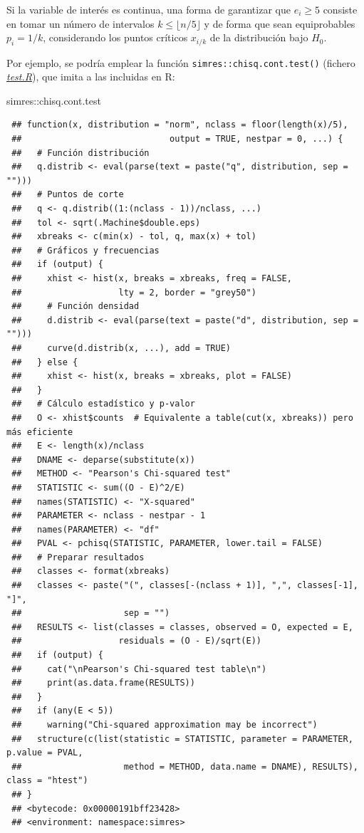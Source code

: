 \documentclass[
]{book}
\newenvironment{Shaded}{\begin{snugshade}}{\end{snugshade}}
\newcommand{\NormalTok}[1]{#1}
\newcommand{\SpecialCharTok}[1]{\textcolor[rgb]{0.00,0.00,0.00}{#1}}
\theoremstyle{break}
\theoremstyle{nonumberplain}
\begin{document}
Si la variable de interés es continua, una forma de garantizar que \(e_{i}\geq5\) consiste en tomar un número de intervalos \(k\leq \lfloor n/5 \rfloor\) y de forma que sean equiprobables \(p_{i}=1/k\),
considerando los puntos críticos \(x_{i/k}\) de la distribución bajo \(H_0\).

Por ejemplo, se podría emplear la función \texttt{simres::chisq.cont.test()} (fichero \href{R/test.R}{\emph{test.R}}), que imita a las incluidas en R:

\begin{Shaded}
\begin{Highlighting}[]
\NormalTok{simres}\SpecialCharTok{::}\NormalTok{chisq.cont.test}
\end{Highlighting}
\end{Shaded}

\begin{verbatim}
 ## function(x, distribution = "norm", nclass = floor(length(x)/5),
 ##                             output = TRUE, nestpar = 0, ...) {
 ##   # Función distribución
 ##   q.distrib <- eval(parse(text = paste("q", distribution, sep = "")))
 ##   # Puntos de corte
 ##   q <- q.distrib((1:(nclass - 1))/nclass, ...)
 ##   tol <- sqrt(.Machine$double.eps)
 ##   xbreaks <- c(min(x) - tol, q, max(x) + tol)
 ##   # Gráficos y frecuencias
 ##   if (output) {
 ##     xhist <- hist(x, breaks = xbreaks, freq = FALSE,
 ##                   lty = 2, border = "grey50")
 ##     # Función densidad
 ##     d.distrib <- eval(parse(text = paste("d", distribution, sep = "")))
 ##     curve(d.distrib(x, ...), add = TRUE)
 ##   } else {
 ##     xhist <- hist(x, breaks = xbreaks, plot = FALSE)
 ##   }
 ##   # Cálculo estadístico y p-valor
 ##   O <- xhist$counts  # Equivalente a table(cut(x, xbreaks)) pero más eficiente
 ##   E <- length(x)/nclass
 ##   DNAME <- deparse(substitute(x))
 ##   METHOD <- "Pearson's Chi-squared test"
 ##   STATISTIC <- sum((O - E)^2/E)
 ##   names(STATISTIC) <- "X-squared"
 ##   PARAMETER <- nclass - nestpar - 1
 ##   names(PARAMETER) <- "df"
 ##   PVAL <- pchisq(STATISTIC, PARAMETER, lower.tail = FALSE)
 ##   # Preparar resultados
 ##   classes <- format(xbreaks)
 ##   classes <- paste("(", classes[-(nclass + 1)], ",", classes[-1], "]",
 ##                    sep = "")
 ##   RESULTS <- list(classes = classes, observed = O, expected = E,
 ##                   residuals = (O - E)/sqrt(E))
 ##   if (output) {
 ##     cat("\nPearson's Chi-squared test table\n")
 ##     print(as.data.frame(RESULTS))
 ##   }
 ##   if (any(E < 5))
 ##     warning("Chi-squared approximation may be incorrect")
 ##   structure(c(list(statistic = STATISTIC, parameter = PARAMETER, p.value = PVAL,
 ##                    method = METHOD, data.name = DNAME), RESULTS), class = "htest")
 ## }
 ## <bytecode: 0x00000191bff23428>
 ## <environment: namespace:simres>
\end{verbatim}
\end{document}
